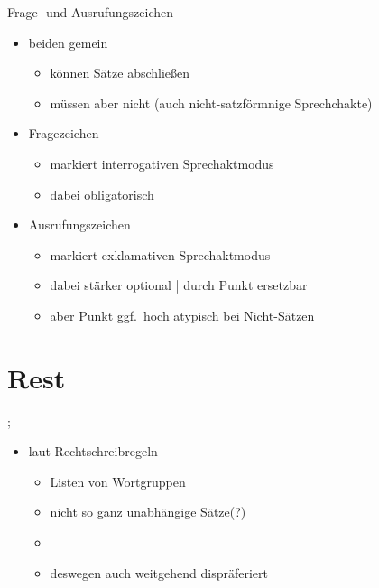 \begin{frame}
  {Frage- und Ausrufungszeichen}
  \onslide<+->
  \begin{itemize}[<+->]
    \item beiden gemein
      \begin{itemize}[<+->]
        \item \alert{können} Sätze abschließen
        \item \alert{müssen aber nicht} (auch nicht-satzförmnige Sprechchakte)
      \end{itemize}
      \Zeile
    \item Fragezeichen
      \begin{itemize}[<+->]
        \item markiert interrogativen Sprechaktmodus
        \item dabei \alert{obligatorisch}
      \end{itemize}
      \Zeile
    \item Ausrufungszeichen
      \begin{itemize}[<+->]
        \item markiert exklamativen Sprechaktmodus
        \item dabei stärker \alert{optional} | durch Punkt ersetzbar
        \item aber Punkt ggf.\ hoch atypisch bei Nicht-Sätzen
      \end{itemize}
  \end{itemize}
\end{frame}

\section{Rest}

\begin{frame}
  {;}
  \onslide<+->
  \begin{itemize}[<+->]
    \item laut Rechtschreibregeln
      \Halbzeile
      \begin{itemize}[<+->]
        \item Listen von Wortgruppen\\
          \Halbzeile
        \item nicht so ganz unabhängige Sätze(?)\\
          \grau{}
          \Halbzeile
        \item {}
        \item deswegen auch weitgehend dispräferiert
      \end{itemize}
  \end{itemize}
\end{frame}

